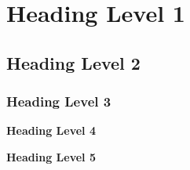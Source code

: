 \section{Heading Level 1}

\subsection{Heading Level 2}

\subsubsection{Heading Level 3}

\textbf{Heading Level 4}

\textbf{Heading Level 5}

